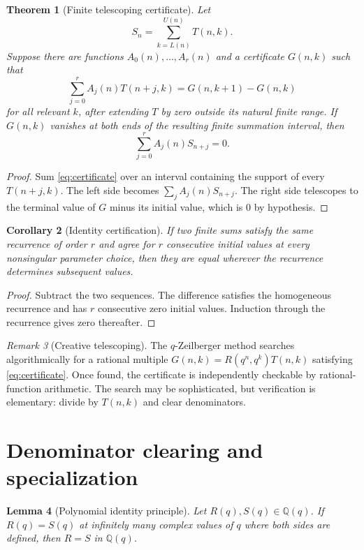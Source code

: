 \documentclass[11pt,oneside,openany]{book}
\newtheorem{theorem}{Theorem}[chapter]
\newtheorem{lemma}[theorem]{Lemma}
\newtheorem{corollary}[theorem]{Corollary}
\theoremstyle{definition}
\theoremstyle{remark}
\newtheorem{remark}[theorem]{Remark}
\newcommand{\Q}{\mathbb Q}
\begin{document}
\begin{theorem}[Finite telescoping certificate]\label{thm:telescoping-certificate}
Let
\[
 S_n=\sum_{k=L(n)}^{U(n)}T(n,k).
\]
Suppose there are functions $A_0(n),\ldots,A_r(n)$ and a certificate $G(n,k)$ such that
\[
 \sum_{j=0}^{r}A_j(n)T(n+j,k)
 =G(n,k+1)-G(n,k)
 \tag{20.1}\label{eq:certificate}
\]
for all relevant $k$, after extending $T$ by zero outside its natural finite range.  If $G(n,k)$ vanishes at both ends of the resulting finite summation interval, then
\[
 \sum_{j=0}^{r}A_j(n)S_{n+j}=0.
 \tag{20.2}\label{eq:certified-recurrence}
\]
\end{theorem}

\begin{proof}
Sum \eqref{eq:certificate} over an interval containing the support of every $T(n+j,k)$.  The left side becomes
$\sum_jA_j(n)S_{n+j}$.  The right side telescopes to the terminal value of $G$ minus its initial value, which is $0$ by hypothesis.
\end{proof}

\begin{corollary}[Identity certification]\label{cor:identity-certification}
If two finite sums satisfy the same recurrence of order $r$ and agree for $r$ consecutive initial values at every nonsingular parameter choice, then they are equal wherever the recurrence determines subsequent values.
\end{corollary}

\begin{proof}
Subtract the two sequences.  The difference satisfies the homogeneous recurrence and has $r$ consecutive zero initial values.  Induction through the recurrence gives zero thereafter.
\end{proof}

\begin{remark}[Creative telescoping]
The $q$-Zeilberger method searches algorithmically for a rational multiple $G(n,k)=R(q^n,q^k)T(n,k)$ satisfying \eqref{eq:certificate}.  Once found, the certificate is independently checkable by rational-function arithmetic.  The search may be sophisticated, but verification is elementary: divide by $T(n,k)$ and clear denominators.
\end{remark}

\section{Denominator clearing and specialization}

\begin{lemma}[Polynomial identity principle]\label{lem:polynomial-identity-principle}
Let $R(q),S(q)\in\Q(q)$.  If $R(q)=S(q)$ at infinitely many complex values of $q$ where both sides are defined, then $R=S$ in $\Q(q)$.
\end{lemma}
\end{document}
